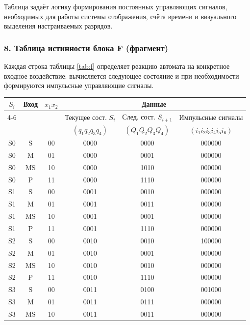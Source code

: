\documentclass[11pt,a4paper,final]{article}
\begin{document}
	Таблица задаёт логику формирования постоянных управляющих сигналов, необходимых для работы системы отображения, счёта времени и визуального выделения настраиваемых разрядов.
	

	\subsubsection*{8. Таблица истинности блока F (фрагмент)}
	
	Каждая строка таблицы \ref{tab:f} определяет реакцию автомата на конкретное входное воздействие: вычисляется следующее состояние и при необходимости формируются импульсные управляющие сигналы.
	
	\scriptsize
	\begin{center}
		\label{tab:f}
		\begin{tabular}{|c|c|c||c|c|c|}
			\hline
			\multirow{2}{*}{\( S_i \)} & \multirow{2}{*}{Вход} & \multirow{2}{*}{\( x_1 x_2 \)} & \multicolumn{3}{c|}{Данные} \\
			\cline{4-6}
			& & & Текущее сост. \( S_i \) & След. сост. \( S_{i+1} \) & Импульсные сигналы \\
			& & & \( (q_1 q_2 q_3 q_4) \) & \( (Q_1 Q_2 Q_3 Q_4) \) & \( (i_1 i_2 i_3 i_4 i_5 i_6) \) \\
			\hline\hline
			S0 & S & 00 & 0000 & 0000 & 000000 \\
			S0 & M & 01 & 0000 & 0001 & 000000 \\
			S0 & MS & 10 & 0000 & 1010 & 000000 \\
			S0 & P & 11 & 0000 & 1110 & 000000 \\
			\hline
			S1 & S & 00 & 0001 & 0010 & 000000 \\
			S1 & M & 01 & 0001 & 0011 & 000000 \\
			S1 & MS & 10 & 0001 & 0001 & 000000 \\
			S1 & P & 11 & 0001 & 1110 & 000000 \\
			\hline
			S2 & S & 00 & 0010 & 0010 & 100000 \\
			S2 & M & 01 & 0010 & 0001 & 000000 \\
			S2 & MS & 10 & 0010 & 0010 & 000000 \\
			S2 & P & 11 & 0010 & 1110 & 000000 \\
			\hline
			S3 & S & 00 & 0011 & 0100 & 001000 \\
			S3 & M & 01 & 0011 & 0111 & 000000 \\
			S3 & MS & 10 & 0011 & 0011 & 000000 \\

\end{tabular}
\end{center}
\end{document}
